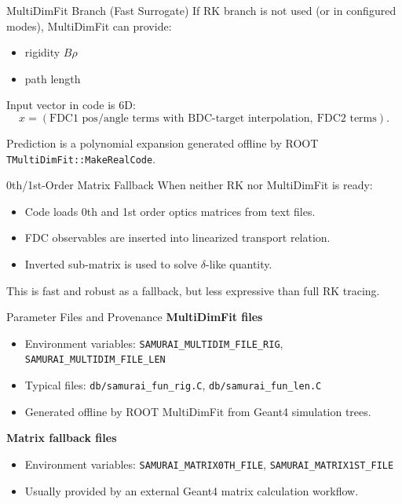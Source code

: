 \documentclass[aspectratio=169]{beamer}
\begin{document}
\begin{frame}{MultiDimFit Branch (Fast Surrogate)}
If RK branch is not used (or in configured modes), MultiDimFit can provide:
\begin{itemize}
\item rigidity \(B\rho\)
\item path length
\end{itemize}

\vspace{0.2cm}
Input vector in code is 6D:
\[
x = (\text{FDC1 pos/angle terms with BDC-target interpolation},\ \text{FDC2 terms}).
\]

\vspace{0.2cm}
Prediction is a polynomial expansion generated offline by ROOT \texttt{TMultiDimFit::MakeRealCode}.
\end{frame}

\begin{frame}{0th/1st-Order Matrix Fallback}
When neither RK nor MultiDimFit is ready:
\begin{itemize}
\item Code loads 0th and 1st order optics matrices from text files.
\item FDC observables are inserted into linearized transport relation.
\item Inverted sub-matrix is used to solve \(\delta\)-like quantity.
\end{itemize}

\vspace{0.2cm}
This is fast and robust as a fallback, but less expressive than full RK tracing.
\end{frame}

\begin{frame}{Parameter Files and Provenance}
\textbf{MultiDimFit files}
\begin{itemize}
\item Environment variables:
  \texttt{SAMURAI\_MULTIDIM\_FILE\_RIG}, \texttt{SAMURAI\_MULTIDIM\_FILE\_LEN}
\item Typical files: \texttt{db/samurai\_fun\_rig.C}, \texttt{db/samurai\_fun\_len.C}
\item Generated offline by ROOT MultiDimFit from Geant4 simulation trees.
\end{itemize}

\textbf{Matrix fallback files}
\begin{itemize}
\item Environment variables:
  \texttt{SAMURAI\_MATRIX0TH\_FILE}, \texttt{SAMURAI\_MATRIX1ST\_FILE}
\item Usually provided by an external Geant4 matrix calculation workflow.
\end{itemize}
\end{frame}
\end{document}

